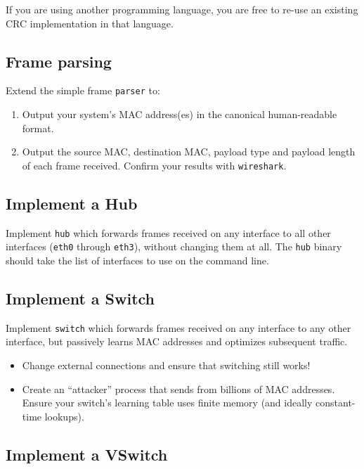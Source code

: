\documentclass{article}
\begin{document}
If you are using another programming language, you are free to re-use
an existing CRC implementation in that language.


\subsection{Frame parsing}

Extend the simple frame {\tt parser} to:
\begin{enumerate}
\item Output your system's MAC address(es) in the canonical human-readable format.
\item Output the source MAC, destination MAC, payload type and payload length
  of each frame received. Confirm your results with {\tt wireshark}.
\end{enumerate}

\subsection{Implement a Hub}

Implement {\tt hub} which forwards frames received on any interface to
all other interfaces ({\tt eth0} through {\tt eth3}), without changing
them at all.  The {\tt hub} binary should take the list of interfaces
to use on the command line.

\subsection{Implement a Switch}

Implement {\tt switch} which forwards frames received on any
interface to any other interface, but passively learns MAC addresses
and optimizes subsequent traffic.

\begin{itemize}
\item Change external connections and ensure that switching still works!
\item Create an ``attacker'' process that sends from billions of MAC
  addresses.  Ensure your switch's learning table uses finite memory
  (and ideally constant-time lookups).
\end{itemize}

\subsection{Implement a VSwitch}
\end{document}
